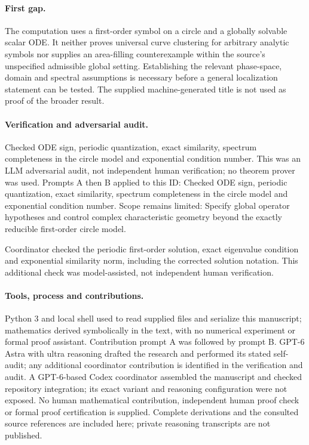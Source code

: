 \documentclass[11pt]{article}
\begin{document}
\paragraph{First gap.}The computation uses a first-order symbol on a circle and a globally solvable scalar ODE. It neither proves universal curve clustering for arbitrary analytic symbols nor supplies an area-filling counterexample within the source's unspecified admissible global setting. Establishing the relevant phase-space, domain and spectral assumptions is necessary before a general localization statement can be tested. The supplied machine-generated title is not used as proof of the broader result.

\paragraph{Verification and adversarial audit.}
Checked ODE sign, periodic quantization, exact similarity, spectrum completeness in the circle model and exponential condition number. This was an LLM adversarial audit, not independent human verification; no theorem prover was used. Prompts A then B applied to this ID: Checked ODE sign, periodic quantization, exact similarity, spectrum completeness in the circle model and exponential condition number. Scope remains limited: Specify global operator hypotheses and control complex characteristic geometry beyond the exactly reducible first-order circle model.

Coordinator checked the periodic first-order solution, exact eigenvalue condition and exponential similarity norm, including the corrected solution notation. This additional check was model-assisted, not independent human verification.

\paragraph{Tools, process and contributions.}
Python 3 and local shell used to read supplied files and serialize this manuscript; mathematics derived symbolically in the text, with no numerical experiment or formal proof assistant. Contribution prompt A was followed by prompt B. GPT-6 Astra with ultra reasoning drafted the research and performed its stated self-audit; any additional coordinator contribution is identified in the verification and audit. A GPT-6-based Codex coordinator assembled the manuscript and checked repository integration; its exact variant and reasoning configuration were not exposed. No human mathematical contribution, independent human proof check or formal proof certification is supplied. Complete derivations and the consulted source references are included here; private reasoning transcripts are not published.
\end{document}
